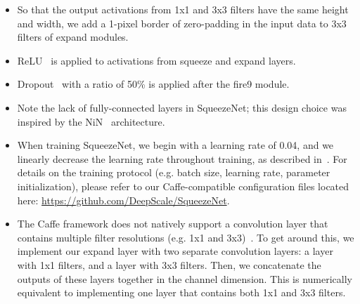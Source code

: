 \documentclass{article} %
\renewcommand{\cite}{\citep}
\begin{document}
\begin{itemize}
	\setlength\itemsep{0in} %
	\item[$\bullet$]{So that the output activations from 1x1 and 3x3 filters have the same height and width, we add a 1-pixel border of zero-padding in the input data to 3x3 filters of expand modules.}
	\item[$\bullet$]{ReLU~\cite{ReLU} is applied to activations from squeeze and expand layers.}
	\item[$\bullet$]{Dropout~\cite{dropout} with a ratio of 50\% is applied after the fire9 module.}
	\item[$\bullet$]{Note the lack of fully-connected layers in SqueezeNet; this design choice was inspired by the NiN~\cite{NiN} architecture.}
	\item[$\bullet$]{When training SqueezeNet, we begin with a learning rate of 0.04, and we linearly decrease the learning rate throughout training, as described in~\cite{linearLR}.
		For details on the training protocol (e.g. batch size, learning rate, parameter initialization), please refer to our Caffe-compatible configuration files located here: \href{https://github.com/DeepScale/SqueezeNet}{https://github.com/DeepScale/SqueezeNet}.}
	\item[$\bullet$]{The Caffe framework does not natively support a convolution layer that contains multiple filter resolutions (e.g. 1x1 and 3x3)~\cite{jia2014caffe}. To get around this, we implement our expand layer with two separate convolution layers: a layer with 1x1 filters, and a layer with 3x3 filters. Then, we concatenate the outputs of these layers together in the channel dimension. This is numerically equivalent to implementing one layer that contains both 1x1 and 3x3 filters.}
\end{itemize}
\end{document}
